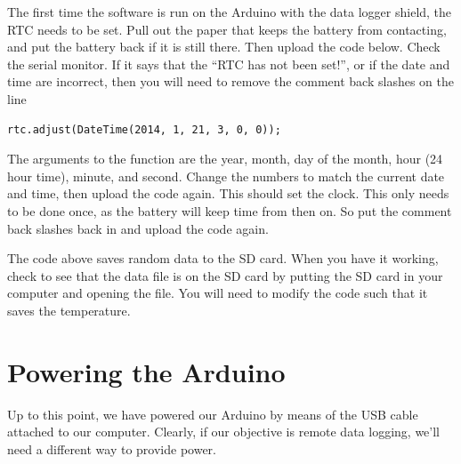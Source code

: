 The first time the software is run on the Arduino with the data logger shield, 
the RTC needs to be set.  Pull out the paper that keeps the battery from 
contacting, and put the battery back if it is still there. Then upload the 
code below. Check the serial monitor. If it says that the ``RTC has not been 
set!'', or if the date and time are incorrect, then you will need to remove 
the comment back slashes on the line 
    \begin{lstlisting}[language=Arduino]
    rtc.adjust(DateTime(2014, 1, 21, 3, 0, 0));
    \end{lstlisting}
The arguments to the  function are the year, month, day of the 
month, hour (24 hour time), minute, and second.
Change the numbers to match the current date and time, then upload the code 
again. This should set the clock. This only needs to be done once, as the 
battery will keep time from then on. So put the comment back slashes back in 
and upload the code again.



The code above saves random data to the SD card. When you have it working, 
check to see that the data file is on the SD card by putting the SD card in 
your computer and opening the file.  You will need to modify the code such that 
it saves the temperature.

\section{Powering the Arduino}

Up to this point, we have powered our Arduino by means of the USB cable attached
to our computer. Clearly, if our objective is remote data logging, we'll need
a different way to provide power.

